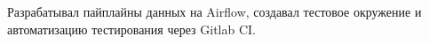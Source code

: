 Разрабатывал пайплайны данных на Airflow, создавал тестовое окружение и автоматизацию тестирования через Gitlab CI.
